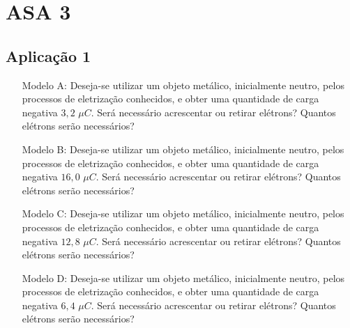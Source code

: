 \chapter{ASA 3} \label{apendice:asa3}
\section{Aplicação 1} \label{ch:ASA3a1}

\begin{itemize}
    \item[Modelo A:] Deseja-se utilizar um objeto metálico, inicialmente neutro, pelos processos de eletrização conhecidos, e obter uma quantidade de carga negativa $3,2$ $\mu C$. Será necessário acrescentar ou retirar elétrons? Quantos elétrons serão necessários? 
    
    \item[Modelo B:] Deseja-se utilizar um objeto metálico, inicialmente neutro, pelos processos de eletrização conhecidos, e obter uma quantidade de carga negativa $16,0$ $\mu C$. Será necessário acrescentar ou retirar elétrons? Quantos elétrons serão necessários? 
   
    \item[Modelo C:] Deseja-se utilizar um objeto metálico, inicialmente neutro, pelos processos de eletrização conhecidos, e obter uma quantidade de carga negativa $12,8$ $\mu C$. Será necessário acrescentar ou retirar elétrons? Quantos elétrons serão necessários? 
    
    \item[Modelo D:] Deseja-se utilizar um objeto metálico, inicialmente neutro, pelos processos de eletrização conhecidos, e obter uma quantidade de carga negativa $6,4$ $\mu C$. Será necessário acrescentar ou retirar elétrons? Quantos elétrons serão necessários? 

\end{itemize}
\newpage
